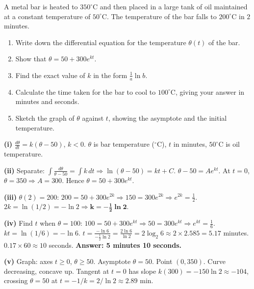 \documentclass[11pt]{article}
\newcounter{popsec}
\newcounter{popsub}
\newcommand{\courssub}[1]{%
  \stepcounter{popsub}%
  \par\vspace{9pt}\noindent{\popxbold\fontsize{11.5}{13}\selectfont\color{popink}{\color{poporange}\thepopsec.\thepopsub}\hspace{6pt}#1}\par\nopagebreak\vspace{4pt}
}
\begin{document}
\courssub{Practice Exercise}

\begin{exercice}
A metal bar is heated to $350^\circ\mathrm{C}$ and then placed in a large tank of oil maintained at a constant temperature of $50^\circ\mathrm{C}$. The temperature of the bar falls to $200^\circ\mathrm{C}$ in $2$ minutes.
\begin{enumerate}
\item Write down the differential equation for the temperature $\theta(t)$ of the bar.
\item Show that $\theta = 50 + 300e^{kt}$.
\item Find the exact value of $k$ in the form $\frac{1}{a}\ln b$.
\item Calculate the time taken for the bar to cool to $100^\circ\mathrm{C}$, giving your answer in minutes and seconds.
\item Sketch the graph of $\theta$ against $t$, showing the asymptote and the initial temperature.
\end{enumerate}
\end{exercice}

\begin{corrige}[Exercise 1]
\textbf{(i)} $\frac{d\theta}{dt} = k(\theta - 50)$, $k<0$. $\theta$ is bar temperature ($^\circ\mathrm{C}$), $t$ in minutes, $50^\circ\mathrm{C}$ is oil temperature.

\textbf{(ii)} Separate: $\int \frac{d\theta}{\theta-50} = \int k\,dt \Rightarrow \ln(\theta-50) = kt + C$.
$\theta-50 = Ae^{kt}$. At $t=0$, $\theta=350 \Rightarrow A=300$. Hence $\theta = 50 + 300e^{kt}$.

\textbf{(iii)} $\theta(2)=200$: $200 = 50 + 300e^{2k} \Rightarrow 150 = 300e^{2k} \Rightarrow e^{2k} = \frac{1}{2}$.
$2k = \ln(1/2) = -\ln 2 \Rightarrow \mathbf{k = -\frac{1}{2}\ln 2}$.

\textbf{(iv)} Find $t$ when $\theta=100$:
$100 = 50 + 300e^{kt} \Rightarrow 50 = 300e^{kt} \Rightarrow e^{kt} = \frac{1}{6}$.
$kt = \ln(1/6) = -\ln 6$.
$t = \frac{-\ln 6}{-\frac{1}{2}\ln 2} = \frac{2\ln 6}{\ln 2} = 2\log_2 6 \approx 2 \times 2.585 = 5.17$ minutes.
$0.17 \times 60 \approx 10$ seconds. \textbf{Answer: 5 minutes 10 seconds.}

\textbf{(v)} Graph: axes $t\ge0$, $\theta\ge50$. Asymptote $\theta=50$. Point $(0,350)$. Curve decreasing, concave up. Tangent at $t=0$ has slope $k(300) = -150\ln 2 \approx -104$, crossing $\theta=50$ at $t = -1/k = 2/\ln 2 \approx 2.89$ min.
\end{corrige}
\end{document}
